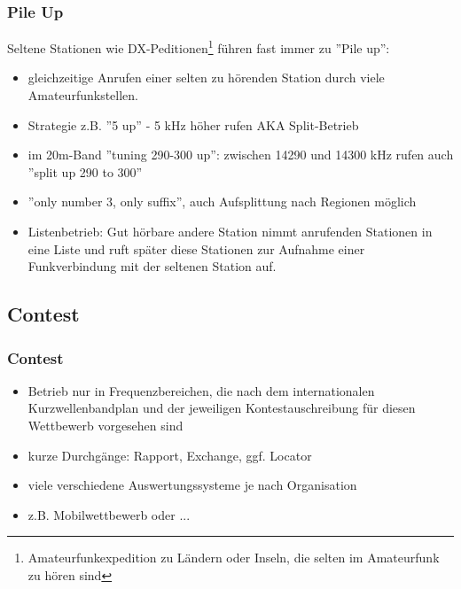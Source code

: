 \begin{frame}
    \frametitle{Pile Up}


    Seltene Stationen wie DX-Peditionen\footnote{Amateurfunkexpedition zu
    Ländern oder Inseln, die selten im Amateurfunk zu hören sind} führen fast
    immer zu ''Pile up'':

    \begin{itemize}
        \item gleichzeitige Anrufen einer selten zu hörenden Station durch viele
              Amateurfunkstellen.
        \item Strategie z.B. ''5 up'' - 5 kHz höher rufen AKA Split-Betrieb
        \item im 20m-Band ''tuning 290-300 up'': zwischen 14290 und 14300 kHz rufen
              auch ''split up 290 to 300''
        \item ''only number 3, only suffix'', auch Aufsplittung nach Regionen möglich
        \item Listenbetrieb: Gut hörbare andere Station nimmt anrufenden
        Stationen in eine Liste und ruft später diese Stationen zur Aufnahme
        einer Funkverbindung mit der seltenen Station auf.
    \end{itemize}
\end{frame}

\subsection{Contest}

\begin{frame}
    \frametitle{Contest}


    \begin{itemize}
        \item Betrieb nur in Frequenzbereichen, die nach dem internationalen
          Kurzwellenbandplan und der jeweiligen Kontestauschreibung für diesen
          Wettbewerb vorgesehen sind
        \item kurze Durchgänge: Rapport, Exchange, ggf. Locator
        \item viele verschiedene Auswertungssysteme je nach Organisation
        \item z.B. Mobilwettbewerb oder ...
    \end{itemize}

\end{frame}

